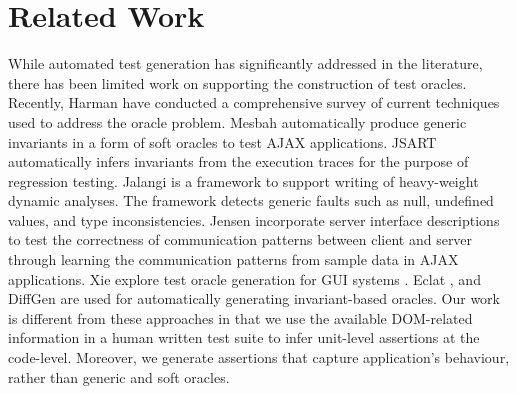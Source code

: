 \section{Related Work} \label{Sec:related}
While automated test generation has significantly addressed in the literature, there has been limited work on supporting the construction of test oracles. Recently, Harman \etal \cite{harman:tech13} have conducted a comprehensive survey of current techniques used to address the oracle problem.
Mesbah \etal \cite{mesbah:tse12} automatically produce generic invariants in a form of soft oracles to test AJAX applications. JSART \cite{mirshokraie:icwe12} automatically infers \javascript invariants from the execution traces for the purpose of regression testing. Jalangi \cite{sen:fse13} is a framework to support writing of heavy-weight dynamic analyses. The framework detects generic \javascript faults such as null, undefined values, and type inconsistencies. Jensen \etal \cite{jensen:fse13} incorporate server interface descriptions to test the correctness of communication patterns between client and server through learning the communication patterns from sample data in AJAX applications.
Xie \etal explore test oracle generation for GUI systems \cite{xie:tosem07}. 
Eclat \cite{pacheco:ecoop05}, and DiffGen \cite{taneja:ase08} are used for automatically generating invariant-based oracles. 
Our work is different from these approaches in that we use the available DOM-related information in a human written test suite to infer unit-level assertions at the \javascript code-level. Moreover, we generate assertions that capture application's behaviour, rather than generic and soft oracles. 


